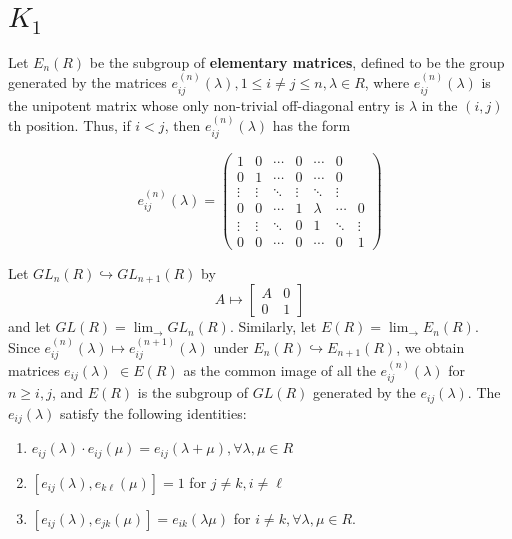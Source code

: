 \section{$K_1$}

Let $E_n(R)$ be the subgroup of \textbf{elementary matrices}, defined to be the group generated by the matrices $e_{i j}^{(n)}(\lambda), 1 \leq i \neq j \leq n, \lambda \in R$, where $e_{i j}^{(n)}(\lambda)$ is the unipotent matrix whose only non-trivial off-diagonal entry is $\lambda$ in the $(i, j)$ th position. Thus, if $i<j$, then $e_{i j}^{(n)}(\lambda)$ has the form 

\[
e_{ij}^{(n)}(\lambda) =
\begin{pmatrix}
1 & 0 & \cdots & 0 & \cdots & 0 \\
0 & 1 & \cdots & 0 & \cdots & 0 \\
\vdots & \vdots & \ddots & \vdots & \ddots & \vdots \\
0 & 0 & \cdots & 1 & \lambda & \cdots & 0 \\
\vdots & \vdots & \ddots & 0 & 1 & \ddots & \vdots \\
0 & 0 & \cdots & 0 & \cdots & 0 & 1
\end{pmatrix}
\]

Let $G L_n(R) \hookrightarrow G L_{n+1}(R)$ by
$$
A \longmapsto\left[\begin{array}{ll}
A & 0 \\
0 & 1
\end{array}\right]
$$
and let $G L(R)=\lim _{\rightarrow} G L_n(R)$. Similarly, let $E(R)=\lim _{\rightarrow} E_n(R)$. Since $e_{i j}^{(n)}(\lambda) \longmapsto e_{i j}^{(n+1)}(\lambda)$ under $E_n(R) \hookrightarrow E_{n+1}(R)$, we obtain matrices $e_{i j}(\lambda)$ $\in E(R)$ as the common image of all the $e_{i j}^{(n)}(\lambda)$ for $n \geq i, j$, and $E(R)$ is the subgroup of $G L(R)$ generated by the $e_{i j}(\lambda)$. The $e_{i j}(\lambda)$ satisfy the following identities:

\begin{enumerate}
    \item $e_{i j}(\lambda) \cdot e_{i j}(\mu)=e_{i j}(\lambda+\mu), \forall \lambda, \mu \in R$
    \item $\left[e_{i j}(\lambda), e_{k \ell}(\mu)\right]=1$ for $j \neq k, i \neq \ell$
    \item $\left[e_{i j}(\lambda), e_{j k}(\mu)\right]=e_{i k}(\lambda \mu)$ for $i \neq k, \forall \lambda, \mu \in R$.
\end{enumerate}

